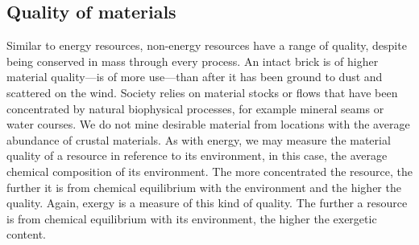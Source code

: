\subsection{Quality of materials}
\label{sec:material_quality}


%
%

Similar to energy resources, 
non-energy resources 
have a range of quality, despite being conserved
in mass through every process.
An intact brick is of higher material quality---is of more use---than
after it has been ground to dust and scattered on the wind.
Society relies on material stocks or flows 
that have been concentrated by natural biophysical processes,
for example mineral seams or water courses. 
We do not mine desirable material from locations with
the average abundance of crustal materials.
As with energy,
we may measure the material quality of a resource
in reference to its environment,
in this case,
the average chemical composition of
its environment.
The more concentrated the resource,
the further it is from chemical equilibrium
with the environment and the higher the quality.
Again, exergy is a measure of this kind of quality.
The further a resource is from chemical equilibrium
with its environment,
the higher the exergetic content.

